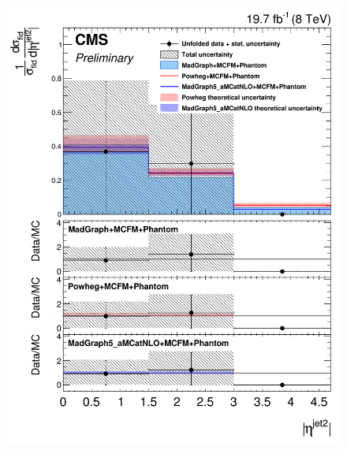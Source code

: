 \begin{figure}[hbtp]
\begin{center}
    \includegraphics[width=\cmsFigWidth]{Figures/DiffCrossSecZZTo2e2mEtaJet2_Unfolded_fr_MadGraph_norm.png}       

\end{center}
\end{figure}
